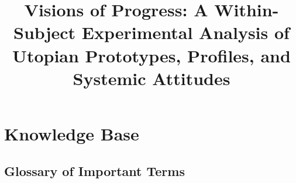 \documentclass[jou,floatsintext]{apa7}
\title{Visions of Progress: A Within-Subject Experimental Analysis of Utopian Prototypes, Profiles, and Systemic Attitudes}
\begin{document}
\maketitle
\thispagestyle{man}

\renewcommand{\contentsname}{Table of Contents}
\tableofcontents


\clearpage
\section{Knowledge Base}
\label{sec:knowledgeBase}

\subsection{Glossary of Important Terms}
\end{document}
